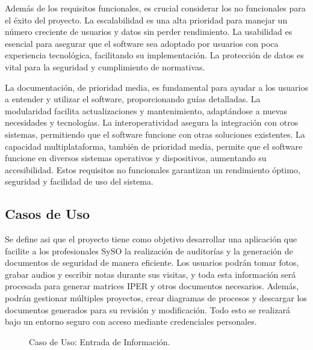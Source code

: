 Además de los requisitos funcionales, es crucial considerar los no funcionales para el éxito del proyecto. La escalabilidad es una alta prioridad para manejar un número creciente de usuarios y datos sin perder rendimiento. La usabilidad es esencial para asegurar que el software sea adoptado por usuarios con poca experiencia tecnológica, facilitando su implementación. La protección de datos es vital para la seguridad y cumplimiento de normativas.

La documentación, de prioridad media, es fundamental para ayudar a los usuarios a entender y utilizar el software, proporcionando guías detalladas. La modularidad facilita actualizaciones y mantenimiento, adaptándose a nuevas necesidades y tecnologías. La interoperatividad asegura la integración con otros sistemas, permitiendo que el software funcione con otras soluciones existentes. La capacidad multiplataforma, también de prioridad media, permite que el software funcione en diversos sistemas operativos y dispositivos, aumentando su accesibilidad. Estos requisitos no funcionales garantizan un rendimiento óptimo, seguridad y facilidad de uso del sistema.

\subsection{Casos de Uso}

Se define asi que el proyecto tiene como objetivo desarrollar una aplicación que facilite a los profesionales SySO la realización de auditorías y la generación de documentos de seguridad de manera eficiente. Los usuarios podrán tomar fotos, grabar audios y escribir notas durante sus visitas, y toda esta información será procesada para generar matrices IPER y otros documentos necesarios. Además, podrán gestionar múltiples proyectos, crear diagramas de procesos y descargar los documentos generados para su revisión y modificación. Todo esto se realizará bajo un entorno seguro con acceso mediante credenciales personales.

\begin{figure}[h]
	\centering
    \resizebox{\textwidth}{!}{
        {\setlength{\fboxsep}{14pt} 
        \fbox{}}}
	\caption{Caso de Uso: Entrada de Información.}
	\label{fig:caso_de_uso_entrada} 
\end{figure}

